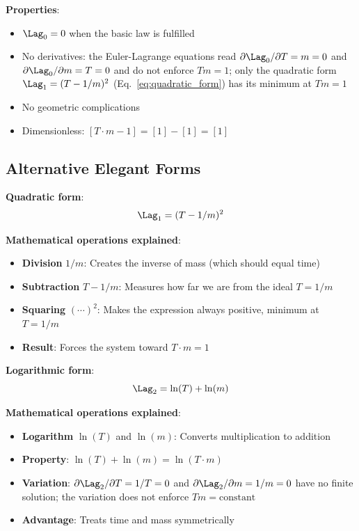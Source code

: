 	\textbf{Properties}:
	\begin{itemize}
		\item $\Lag_0 = 0$ when the basic law is fulfilled
		\item No derivatives: the Euler-Lagrange equations read $\partial\Lag_0/\partial T = m = 0$ and $\partial\Lag_0/\partial m = T = 0$ and do not enforce $T m = 1$; only the quadratic form $\Lag_1 = (T - 1/m)^2$ (Eq.~\eqref{eq:quadratic_form}) has its minimum at $T m = 1$
		\item No geometric complications
		\item Dimensionless: $[T \cdot m - 1] = [1] - [1] = [1]$
	\end{itemize}
	
	\subsection{Alternative Elegant Forms}
	
	\textbf{Quadratic form}:
	\begin{equation}
		\Lag_1 = (T - 1/m)^2
		\label{eq:quadratic_form}
	\end{equation}
	
	\textbf{Mathematical operations explained}:
	\begin{itemize}
		\item \textbf{Division} $1/m$: Creates the inverse of mass (which should equal time)
		\item \textbf{Subtraction} $T - 1/m$: Measures how far we are from the ideal $T = 1/m$
		\item \textbf{Squaring} $(\cdots)^2$: Makes the expression always positive, minimum at $T = 1/m$
		\item \textbf{Result}: Forces the system toward $T \cdot m = 1$
	\end{itemize}
	
	\textbf{Logarithmic form}:
	\begin{equation}
		\Lag_2 = \ln(T) + \ln(m)
		\label{eq:logarithmic_form}
	\end{equation}
	
	\textbf{Mathematical operations explained}:
	\begin{itemize}
		\item \textbf{Logarithm} $\ln(T)$ and $\ln(m)$: Converts multiplication to addition
		\item \textbf{Property}: $\ln(T) + \ln(m) = \ln(T \cdot m)$
		\item \textbf{Variation}: $\partial\Lag_2/\partial T = 1/T = 0$ and $\partial\Lag_2/\partial m = 1/m = 0$ have no finite solution; the variation does not enforce $T m = \text{constant}$
		\item \textbf{Advantage}: Treats time and mass symmetrically
	\end{itemize}
	
